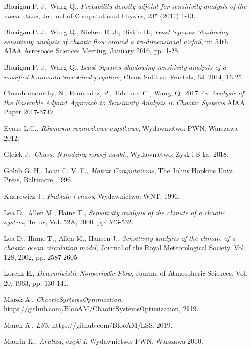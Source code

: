 \documentclass[12pt]{article}
\begin{document}
\begin{thebibliography}{99}
 Blonigan P. J., Wang Q.,
\emph{Probability density adjoint for sensitivity analysis of the mean chaos},
Journal of Computational Physics, 235 (2014) 1-13.

 Blonigan P. J., Wang Q., Nielsen E. J., Diskin B.,
\emph{Least Squares Shadowing sensitivity analysis of chaotic flow around a tw-dimensional airfoil},
in: 54th AIAA Aerosoace Sciences Meeting, January 2016, pp. 1-28.

 Blonigan P. J., Wang Q.,
\emph{Least Squares Shadowing sensitivity analysis of a modified Kuramoto-Sivashinsky eqation},
Chaos Solitons Fractals, 64, 2014, 16-25.

 Chandramoorthy, N., Fernandez, P., Talnikar, C., Wang, Q. 2017 
\emph{An Analysis of the Ensemble Adjoint Approach to Sensitivity Analysis in Chaotic Systems} 
AIAA Paper 2017-3799. 

 Evans L.C.,
\emph{Równania różniczkowe cząstkowe},
Wydawnictwo: PWN, Warszawa 2012.

 Gleick J.,
\emph{Chaos. Narodziny nowej nauki.},
Wydawnictwo: Zysk i S-ka, 2018.

 Golub G. H., Loan C. V. F.,
\emph{Matrix Computations},
The Johns Hopkins Univ. Press, Baltimore, 1996.

 Kudrewicz J., 
\emph{Fraktale i chaos},
Wydawnictwo: WNT, 1996.

 Lea D., Allen M., Haine T.,
\emph{Sensitivity analysis of the climate of a chaotic system},
Tellus, Vol. 52A, 2000, pp. 523-532.

 Lea D., Haine T., Allen M., Hansen J., 
\emph{Sensitivity analysis of the climate of a chaotic ocean circulation model},
Journal of the Royal Meteorological Society, Vol. 128, 2002, pp. 2587-2605.

 Lorenz E.,
\emph{Deterministic Nonperiodic Flow},
Journal of Atmospheric Sciences, Vol. 20, 1963, pp. 130-141.

 Marek A.,
\emph{ChaoticSystemsOptimization},
https://github.com/BlooAM/ChaoticSystemsOptimization, 2019.

 Marek A.,
\emph{LSS},
https://github.com/BlooAM/LSS, 2019.

 Maurin K.,
\emph{Analiza, część I},
Wydawnictwo: PWN, Warszawa 2010.


\end{thebibliography}
\end{document}
